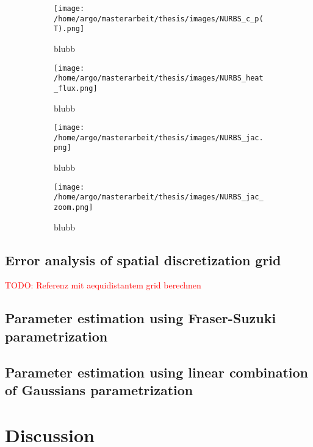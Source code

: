 \documentclass{scrartcl}[12pt, halfparskip]
\newcommand{\todo}[1]{\textcolor{red}{TODO: #1}}
\begin{document}
\begin{figure}[H]
	\begin{subfigure}{0.49\textwidth}
		\texttt{[image: /home/argo/masterarbeit/thesis/images/NURBS\_c\_p(T).png]}
		\caption{blubb}
		\label{fig:NURBS_c_p}
	\end{subfigure}
	\begin{subfigure}{0.49\textwidth}
		\texttt{[image: /home/argo/masterarbeit/thesis/images/NURBS\_heat\_flux.png]}
		\caption{blubb}
		\label{fig:NURBS_heat_flux}
	\end{subfigure}
	\begin{subfigure}{0.49\textwidth}
		\texttt{[image: /home/argo/masterarbeit/thesis/images/NURBS\_jac.png]}
		\caption{blubb}
		\label{fig:NURBS_jac}
	\end{subfigure}
	\begin{subfigure}{0.49\textwidth}
		\texttt{[image: /home/argo/masterarbeit/thesis/images/NURBS\_jac\_zoom.png]}
		\caption{blubb}
		\label{fig:NURBS_jac_zoom}
	\end{subfigure}
	\caption{}
\end{figure}




\subsection{Error analysis of spatial discretization grid}
\todo{Referenz mit aequidistantem grid berechnen}


\subsection{Parameter estimation using Fraser-Suzuki parametrization}

\subsection{Parameter estimation using linear combination of Gaussians parametrization}



\section{Discussion}
\end{document}
